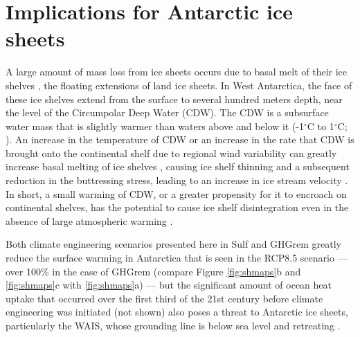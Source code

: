 \documentclass{nature}
\begin{document}
\section{Implications for Antarctic ice sheets}
A large amount of mass loss from ice sheets occurs due to basal melt of their ice shelves \cite{joughin11}, the floating extensions of land ice sheets. In West Antarctica, the face of these ice shelves extend from the surface to several hundred meters depth, near the level of the Circumpolar Deep Water (CDW). The CDW is a subsurface water mass that is slightly warmer than waters above and below it (-1$^\circ$C to 1$^\circ$C; \cite{yin11}). An increase in the temperature of CDW or an increase in the rate that CDW is brought onto the continental shelf due to regional wind variability can greatly increase basal melting of ice shelves \cite{thoma08,joughin11}, causing ice shelf thinning and a subsequent reduction in the buttressing stress, leading to an increase in ice stream velocity \cite{oppenheimer98}. In short, a small warming of CDW, or a greater propensity for it to encroach on continental shelves, has the potential to cause ice shelf disintegration even in the absence of large atmospheric warming \cite{oppenheimer98}. %

Both climate engineering scenarios presented here in Sulf and GHGrem greatly reduce the surface warming in Antarctica that is seen in the RCP8.5 scenario --- over 100\% in the case of GHGrem (compare Figure \ref{fig:shmaps}b and \ref{fig:shmaps}c with \ref{fig:shmaps}a) --- but the significant amount of ocean heat uptake that occurred over the first third of the 21st century before climate engineering was initiated (not shown) also poses a threat to Antarctic ice sheets, particularly the WAIS, whose grounding line is below sea level \cite{joughin11} and retreating \cite{rignot14}. %
\end{document}

